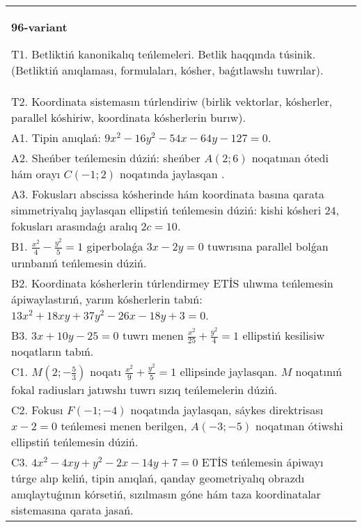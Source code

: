 \documentclass{article}
\begin{document}
\begin{tabular}{m{17cm}}
\textbf{96-variant}
\newline

T1. Betliktiń kanonikalıq teńlemeleri. Betlik haqqında túsinik. (Betliktiń anıqlaması, formulaları, kósher, baǵıtlawshı tuwrılar).\\

T2. Koordinata sistemasın túrlendiriw (birlik vektorlar, kósherler, parallel kóshiriw, koordinata kósherlerin burıw).\\

A1. Tipin anıqlań: $9 x^{2}-16 y^{2}-54 x-64 y-127=0$.\\

A2. Sheńber teńlemesin dúziń: sheńber $A (2;6 ) $ noqatınan ótedi hám orayı $C (-1;2) $ noqatında jaylasqan .\\

A3. Fokusları abscissa kósherinde hám koordinata basına qarata simmetriyalıq jaylasqan ellipstiń teńlemesin dúziń: kishi kósheri $24$, fokusları arasındaǵı aralıq $2 c=10$.\\

B1. $\frac{x^{2}}{4} - \frac{y^{2}}{5} = 1$ giperbolaǵa $3x - 2y = 0$ tuwrısına parallel bolǵan urınbanıń teńlemesin dúziń.  \\

B2. Koordinata kósherlerin túrlendirmey ETİS ulıwma teńlemesin ápiwaylastırıń, yarım kósherlerin tabıń: $13x^{2} + 18xy + 37y^{2} - 26x - 18y + 3 = 0$.  \\

B3. $3x + 10y - 25 = 0$ tuwrı menen $\frac{x^{2}}{25} + \frac{y^{2}}{4} = 1$ ellipstiń kesilisiw noqatların tabıń.\\

C1. $M(2; - \frac{5}{3})$ noqatı $\frac{x^{2}}{9} + \frac{y^{2}}{5} = 1$ ellipsinde jaylasqan. $M$ noqatınıń fokal radiusları jatıwshı tuwrı sızıq teńlemelerin dúziń.  \\

C2. Fokusı $F( - 1; - 4)$ noqatında jaylasqan, sáykes direktrisası $x - 2 = 0$ teńlemesi menen berilgen, $A( - 3; - 5)$ noqatınan ótiwshi ellipstiń teńlemesin dúziń.  \\

C3. $4x^{2} - 4xy + y^{2} - 2x - 14y + 7 = 0$ ETİS teńlemesin ápiwayı túrge alıp keliń, tipin anıqlań, qanday geometriyalıq obrazdı anıqlaytuǵının kórsetiń, sızılmasın góne hám taza koordinatalar sistemasına qarata jasań.  \\

\end{tabular}
\vspace{1cm}
\end{document}
